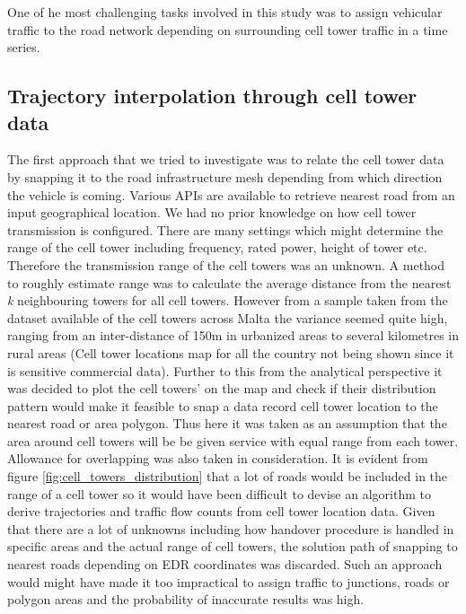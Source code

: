 \documentclass[12pt, a4paper]{report}
\theoremstyle{definition}
\theoremstyle{definition}%
\theoremstyle{definition}%
\theoremstyle{definition}%
\theoremstyle{definition}%
\theoremstyle{definition}%
\begin{document}
One of he most challenging tasks involved in this study was to assign vehicular traffic to the road network depending on surrounding cell tower traffic in a time series.

\subsection{Trajectory interpolation through cell tower data}
The first approach that we tried to investigate was to relate the cell tower data by snapping it to the road infrastructure mesh depending from which direction the vehicle is coming. Various APIs are available to retrieve nearest road from an input geographical location. We had no prior knowledge on how cell tower transmission is configured. There are many settings which might determine the range of the cell tower including frequency, rated power, height of tower etc. Therefore the transmission range of the cell towers was an unknown. A method to roughly estimate range was to calculate the average distance from the nearest \textit{k} neighbouring towers for all cell towers. However from a sample taken from the dataset available of the cell towers across Malta the variance seemed quite high, ranging from an inter-distance of 150m in urbanized areas to several kilometres in rural areas (Cell tower locations map for all the country not being shown since it is sensitive commercial data). Further to this from the analytical perspective it was decided to plot the cell towers' on the map and check if their distribution pattern would make it feasible to snap a data record cell tower location to the nearest road or area polygon. Thus here it was taken as an assumption that the area around cell towers will be be given service with equal range from each tower. Allowance for overlapping was also taken in consideration. It is evident from figure \ref{fig:cell_towers_distribution} that a lot of roads would be included in the range of a cell tower so it would have been difficult to devise an algorithm to derive trajectories and traffic flow counts from cell tower location data. Given that there are a lot of unknowns including how handover procedure is handled in specific areas and the actual range of cell towers, the solution path of snapping to nearest roads depending on EDR coordinates was discarded. Such an approach would might have made it too impractical to assign traffic to junctions, roads or polygon areas and the probability of inaccurate results was high.
\end{document}

